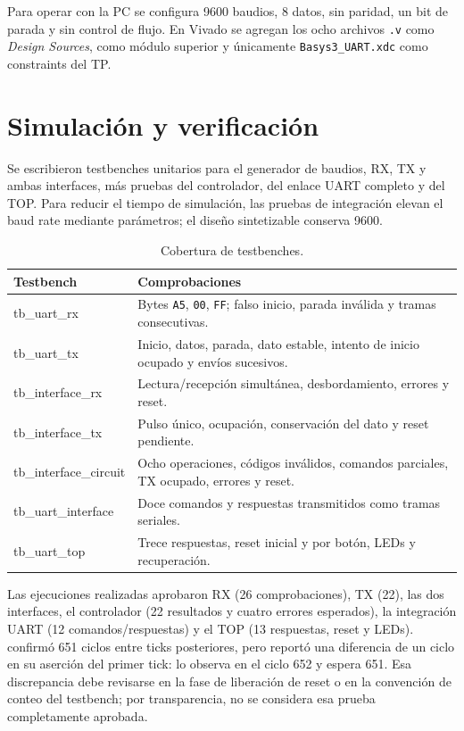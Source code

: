 \documentclass[11pt,a4paper]{article}
\newcommand{\verilog}[1]{\texttt{\detokenize{#1}}}
\begin{document}
Para operar con la PC se configura 9600 baudios, 8 datos, sin paridad, un bit de parada y sin control de flujo. En Vivado se agregan los ocho archivos \texttt{.v} como \textit{Design Sources}, \verilog{uart_top} como módulo superior y únicamente \texttt{Basys3\_UART.xdc} como constraints del TP.

\section{Simulación y verificación}

Se escribieron testbenches unitarios para el generador de baudios, RX, TX y ambas interfaces, más pruebas del controlador, del enlace UART completo y del TOP. Para reducir el tiempo de simulación, las pruebas de integración elevan el baud rate mediante parámetros; el diseño sintetizable conserva 9600.

\begin{table}[ht]
\centering
\caption{Cobertura de testbenches.}
\label{tab:tests}
\renewcommand{\arraystretch}{1.12}
\begin{tabular}{>{\ttfamily}l p{8.4cm}}
\toprule
\normalfont\textbf{Testbench} & \textbf{Comprobaciones}\\
\midrule
tb\_uart\_rx & Bytes \texttt{A5}, \texttt{00}, \texttt{FF}; falso inicio, parada inválida y tramas consecutivas.\\
tb\_uart\_tx & Inicio, datos, parada, dato estable, intento de inicio ocupado y envíos sucesivos.\\
tb\_interface\_rx & Lectura/recepción simultánea, desbordamiento, errores y reset.\\
tb\_interface\_tx & Pulso único, ocupación, conservación del dato y reset pendiente.\\
tb\_interface\_circuit & Ocho operaciones, códigos inválidos, comandos parciales, TX ocupado, errores y reset.\\
tb\_uart\_interface & Doce comandos y respuestas transmitidos como tramas seriales.\\
tb\_uart\_top & Trece respuestas, reset inicial y por botón, LEDs y recuperación.\\
\bottomrule
\end{tabular}
\end{table}

Las ejecuciones realizadas aprobaron RX (26 comprobaciones), TX (22), las dos interfaces, el controlador (22 resultados y cuatro errores esperados), la integración UART (12 comandos/respuestas) y el TOP (13 respuestas, reset y LEDs). \verilog{tb_baud_gen} confirmó 651 ciclos entre ticks posteriores, pero reportó una diferencia de un ciclo en su aserción del primer tick: lo observa en el ciclo 652 y espera 651. Esa discrepancia debe revisarse en la fase de liberación de reset o en la convención de conteo del testbench; por transparencia, no se considera esa prueba completamente aprobada.
\end{document}
